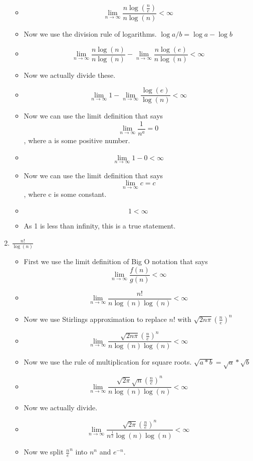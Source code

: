 \begin{enumerate}
\begin{itemize}
  \item {\Large $$\lim_{n \to \infty} \frac{n\log{(\frac{n}{e})}}{n\log{(n)}} <\infty$$}
  \item Now we use the division rule of logarithms. $\log{a/b} = \log{a} - \log{b}$
  \item {\Large $$\lim_{n \to \infty} \frac{n\log{(n)}}{n\log{(n)}} - \lim_{n \to \infty} \frac{n\log{(e)}}{n\log{(n)}} <\infty$$}
  \item Now we actually divide these.
  \item {\Large $$\lim_{n \to \infty} 1 - \lim_{n \to \infty} \frac{\log{(e)}}{\log{(n)}} <\infty$$}
  \item Now we can use the limit definition that says $$\lim_{n \to \infty} \frac{1}{n^{a}} = 0$$, where a is some positive number.
  \item {\Large $$\lim_{n \to \infty} 1 - 0 <\infty$$}
  \item Now we can use the limit definition that says $$\lim_{n \to \infty} c =c$$, where c is some constant.
  \item $$1 <\infty$$
  \item As 1 is less than infinity, this is a true statement.
  \end{itemize}
\item {\large $\frac{n!}{\log{(n)}}$}
  \begin{itemize}
  \item First we use the limit definition of Big O notation that says $$\lim_{n \to \infty} \frac{f(n)}{g(n)} < \infty$$
  \item {\large $$\lim_{n \to \infty} \frac{n!}{n\log{(n)}\log{(n)}} < \infty$$}
  \item Now we use Stirlings approximation to replace $n!$ with $\sqrt{2n\pi}(\frac{n}{e})^{n}$
  \item {\large $$\lim_{n \to \infty} \frac{\sqrt{2n\pi}(\frac{n}{e})^{n}}{n\log{(n)}\log{(n)}} < \infty$$}
  \item Now we use the rule of multiplication for square roots. $\sqrt{a*b} = \sqrt{a}*\sqrt{b}$
  \item {\large $$\lim_{n \to \infty} \frac{\sqrt{2\pi}\sqrt{n}(\frac{n}{e})^{n}}{n\log{(n)}\log{(n)}} < \infty$$}
  \item Now we actually divide.
  \item {\large $$\lim_{n \to \infty} \frac{\sqrt{2\pi}(\frac{n}{e})^{n}}{n^{\frac{1}{2}}\log{(n)}\log{(n)}} < \infty$$}
  \item Now we split $\frac{n}{e}^{n}$ into $n^{n}$ and $e^{-n}$.

\end{itemize}
\end{enumerate}
